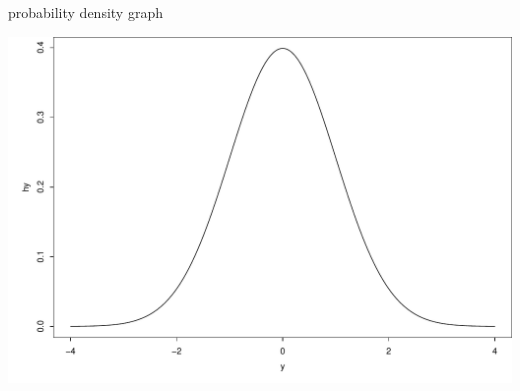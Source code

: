 \documentclass{beamer}\usepackage[]{graphicx}\usepackage[]{color}
\newenvironment{knitrout}{}{} %
\renewenvironment{knitrout}{\begin{spacing}{0.75}\begin{tiny}}{\end{tiny}\end{spacing}}
\begin{document}
\begin{frame}{probability density graph}

\begin{knitrout}\small
{}\color{fgcolor}

{\centering \includegraphics[width=0.99\linewidth]{figure/graphics-unnamed-chunk-7-1} 

}



\end{knitrout}

\end{frame}
\end{document}
